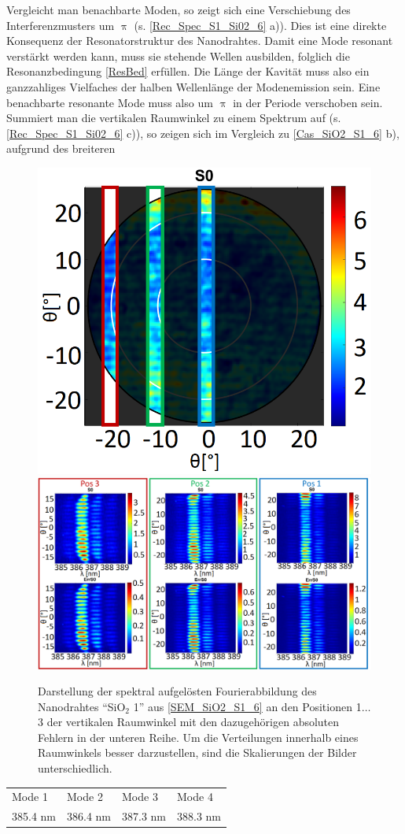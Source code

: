 Vergleicht man benachbarte Moden, so zeigt sich eine Verschiebung des Interferenzmusters um $\uppi$ (s. \autoref{Rec_Spec_S1_Si02_6} a)). Dies ist eine direkte Konsequenz der Resonatorstruktur des Nanodrahtes. Damit eine Mode resonant verstärkt werden kann, muss sie stehende Wellen ausbilden, folglich die Resonanzbedingung \autoref{ResBed} erfüllen. Die Länge der Kavität muss also ein ganzzahliges Vielfaches der halben Wellenlänge der Modenemission sein. Eine benachbarte resonante Mode muss also um $\uppi$ in der Periode verschoben sein. Summiert man die vertikalen Raumwinkel zu einem Spektrum auf (s. \autoref{Rec_Spec_S1_Si02_6} c)), so zeigen sich im Vergleich zu \autoref{Cas_SiO2_S1_6} b), aufgrund des breiteren\begin{figure}[h]
\centering
\includegraphics[width=.33\textwidth]{Bilder/SiO2/S0_Spec_1_S1_Si02_6}
\includegraphics[width=.75\textwidth]{Bilder/SiO2/S0_Spec_S1_Si02_6}
\caption{Darstellung der spektral aufgelösten Fourierabbildung des Nanodrahtes ``SiO$_\text{2}$ 1'' aus \autoref{SEM_SiO2_S1_6} an den Positionen 1$\ldots$3 der vertikalen Raumwinkel mit den dazugehörigen absoluten Fehlern in der unteren Reihe. Um die Verteilungen innerhalb eines Raumwinkels besser darzustellen, sind die Skalierungen der Bilder unterschiedlich.}
\label{S0_Spec_S1_Si02_6}
\end{figure}\begin{table}[h]
\begin{tabular}{llll}
Mode 1 & Mode 2 & Mode 3 & Mode 4 \\ 
385.4 nm & 386.4 nm & 387.3 nm & 388.3 nm \\

\end{tabular}
\end{table}

